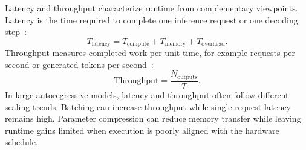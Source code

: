 Latency and throughput characterize runtime from complementary viewpoints. Latency is the time required to complete one inference request or one decoding step~\cite{Sze2017EfficientDNN}:
\begin{equation}
T_{\text{latency}} = T_{\text{compute}} + T_{\text{memory}} + T_{\text{overhead}}.
\end{equation}
Throughput measures completed work per unit time, for example requests per second or generated tokens per second~\cite{Sze2017EfficientDNN}:
\begin{equation}
\mathrm{Throughput} = \frac{N_{\text{outputs}}}{T}.
\end{equation}
In large autoregressive models, latency and throughput often follow different scaling trends. Batching can increase throughput while single-request latency remains high. Parameter compression can reduce memory transfer while leaving runtime gains limited when execution is poorly aligned with the hardware schedule.
